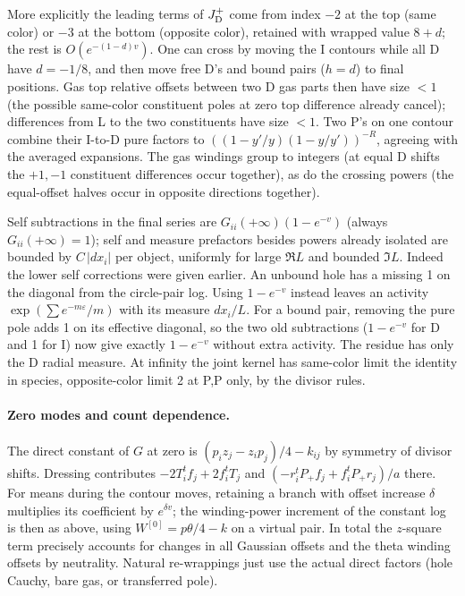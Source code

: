More explicitly the leading terms of \(J_{\rm D}^+\) come from index \(-2\) at the top (same color) or \(-3\) at the bottom (opposite color), retained with wrapped value \(8+d\); the rest is \(O(e^{-(1-d)v})\). One can cross by moving the I contours while all D have \(d=-1/8\), and then move free D's and bound pairs (\(h=d\)) to final positions. Gas top relative offsets between two D gas parts then have size \(<1\) (the possible same-color constituent poles at zero top difference already cancel); differences from L to the two constituents have size \(<1\). Two P's on one contour combine their I-to-D pure factors to \(((1-y'/y)(1-y/y'))^{-R}\), agreeing with the averaged expansions. The gas windings group to integers (at equal D shifts the \(+1,-1\) constituent differences occur together), as do the crossing powers (the equal-offset halves occur in opposite directions together).

Self subtractions in the final series are \(G_{ii}(+\infty)(1-e^{-v})\) (always \(G_{ii}(+\infty)=1\)); self and measure prefactors besides powers already isolated are bounded by \(C\,|dx_i|\) per object, uniformly for large \(\Re L\) and bounded \(\Im L\). Indeed the lower self corrections were given earlier. An unbound hole has a missing 1 on the diagonal from the circle-pair log. Using \(1-e^{-v}\) instead leaves an activity \(\exp(\sum e^{-m\varepsilon}/m)\) with its measure \(dx_i/L\). For a bound pair, removing the pure pole adds 1 on its effective diagonal, so the two old subtractions (\(1-e^{-v}\) for D and 1 for I) now give exactly \(1-e^{-v}\) without extra activity. The residue has only the D radial measure. At infinity the joint kernel has same-color limit the identity in species, opposite-color limit 2 at P,P only, by the divisor rules.

\paragraph{Zero modes and count dependence.}
The direct constant of \(G\) at zero is \((p_i z_j-z_i p_j)/4-k_{ij}\) by symmetry of divisor shifts. Dressing contributes \(-2T_i^tf_j+2 f_i^tT_j\) and \((-r_i^tP_+f_j+f_i^tP_+r_j)/a\) there. For means during the contour moves, retaining a branch with offset increase \(\delta\) multiplies its coefficient by \(e^{\delta v}\); the winding-power increment of the constant log is then as above, using \(W^{[0]}=p\theta/4-k\) on a virtual pair. In total the \(z\)-square term precisely accounts for changes in all Gaussian offsets and the theta winding offsets by neutrality. Natural re-wrappings just use the actual direct factors (hole Cauchy, bare gas, or transferred pole).

